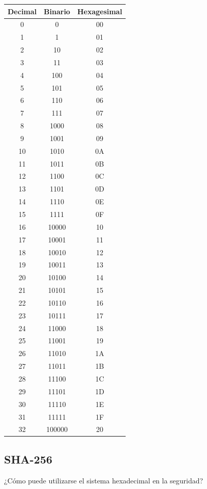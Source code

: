 \documentclass[12pt,a4paper,twoside]{book}
\begin{document}
\begin{center}
\begin{longtable}{|c|c|c|}
\hline 
\textbf{Decimal} & \textbf{Binario} & \textbf{Hexagesimal} \\ 
\hline 
0 & 0 & 00 \\ 
\hline 
1 & 1 & 01 \\ 
\hline 
2 & 10 & 02 \\ 
\hline 
3 & 11 & 03 \\ 
\hline 
4 & 100 & 04 \\ 
\hline 
5 & 101 & 05 \\ 
\hline 
6 & 110 & 06 \\ 
\hline 
7 & 111 & 07 \\ 
\hline 
8 & 1000 & 08 \\ 
\hline 
9 & 1001 & 09 \\ 
\hline 
10 & 1010 & 0A \\ 
\hline 
11 & 1011 & 0B \\ 
\hline 
12 & 1100 & 0C \\ 
\hline 
13 & 1101 & 0D \\ 
\hline 
14 & 1110 & 0E \\ 
\hline 
15 & 1111 & 0F \\ 
\hline 
16 & 10000 & 10 \\ 
\hline 
17 & 10001 & 11 \\ 
\hline 
18 & 10010 & 12 \\ 
\hline 
19 & 10011 & 13 \\ 
\hline 
20 & 10100 & 14 \\ 
\hline 
21 & 10101 & 15 \\ 
\hline 
22 & 10110 & 16 \\ 
\hline 
23 & 10111 & 17 \\ 
\hline 
24 & 11000 & 18 \\ 
\hline 
25 & 11001 & 19 \\ 
\hline 
26 & 11010 & 1A \\ 
\hline 
27 & 11011 & 1B \\ 
\hline 
28 & 11100 & 1C \\ 
\hline 
29 & 11101 & 1D \\ 
\hline 
30 & 11110 & 1E \\ 
\hline 
31 & 11111 & 1F \\ 
\hline 
32 & 100000 & 20 \\ 
\hline 
\end{longtable}
\end{center}

\subsection{SHA-256}
¿Cómo puede utilizarse el sistema hexadecimal en la seguridad?
\end{document}
